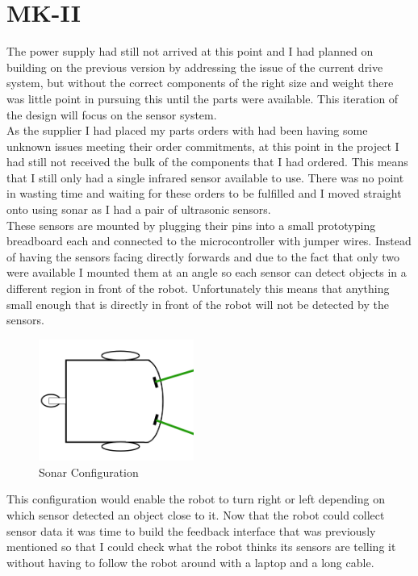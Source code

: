 \section{MK-II}
The power supply had still not arrived at this point and I had planned on building on the previous version by addressing the issue of the current drive system, but without the correct components of the right size and weight there was little point in pursuing this until the parts were available.  This iteration of the design will focus on the sensor system.
\\As the supplier I had placed my parts orders with had been having some unknown issues meeting their order commitments, at this point in the project I had still not received the bulk of the components that I had ordered.  This means that I still only had a single infrared sensor available to use.  There was no point in wasting time and waiting for these orders to be fulfilled and I moved straight onto using sonar as I had a pair of ultrasonic sensors.
\\These sensors are mounted by plugging their pins into a small prototyping breadboard each and connected to the microcontroller with jumper wires.  Instead of having the sensors facing directly forwards and due to the fact that only two were available I mounted them at an angle so each sensor can detect objects in a different region in front of the robot.  Unfortunately this means that anything small enough that is directly in front of the robot will not be detected by the sensors.
\begin{figure}[H]
\centering
        \includegraphics[width=2.0in]  {Images/sonar-placement.png}
        \caption{Sonar Configuration}
        \label{Sonar Configuration}
\end{figure}
This configuration would enable the robot to turn right or left depending on which sensor detected an object close to it.  Now that the robot could collect sensor data it was time to build the feedback interface that was previously mentioned so that I could check what the robot thinks its sensors are telling it without having to follow the robot around with a laptop and a long cable.
